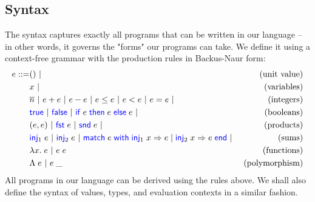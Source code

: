 \documentclass[a4paper, 11pt]{report}
\theoremstyle{definition}
\newcommand{\BNFdef}{::=}
\newcommand{\ALT}{~|~}
\newcommand{\Keyword}[1]{{\color{blue} \mathsf{#1}}}
\newcommand{\var}{x}
\newcommand{\expr}{e}
\newcommand{\TT}{()}
\newcommand{\Num}[1]{\overline{#1}}
\newcommand{\True}{\Keyword{true}}
\newcommand{\False}{\Keyword{false}}
\newcommand{\IfCmd}{\Keyword{if}}
\newcommand{\ThenCmd}{\Keyword{then}}
\newcommand{\ElseCmd}{\Keyword{else}}
\def\If#1then#2else#3{\IfCmd{}\;#1\;\ThenCmd{}\;#2\;\ElseCmd{}\;#3}
\newcommand{\Fst}{\Keyword{fst}\;}
\newcommand{\Snd}{\Keyword{snd}\;}
\newcommand{\Inj}[1]{\Keyword{inj}_{#1}\;}
\newcommand{\MatchCmd}{\Keyword{match}}
\newcommand{\WithCmd}{\Keyword{with}}
\newcommand{\EndCmd}{\Keyword{end}}
\def\Match#1with#2=>#3|#4=>#5end{\MatchCmd{}\;#1\;\WithCmd{}\;#2\Rightarrow#3 \;|\;#4\Rightarrow#5\;\EndCmd{}}
\newcommand{\Tlam}{\Lambda\;}
\newcommand{\Tapp}[1]{#1\;\_}
\begin{document}
\subsection{Syntax}
The syntax captures exactly all programs that can be written in our language – in other words, it governs the "forms" our programs can take. We define it using a context-free grammar with the production rules in Backus-Naur form:
\begin{align*}
  \expr \BNFdef & \TT \ALT & \text{(unit value)}\\
                & \var \ALT & \text{(variables)}\\
                & \Num{n} \ALT \expr + \expr \ALT \expr - \expr \ALT
                  \expr \le \expr \ALT \expr < \expr \ALT 
                  \expr = \expr \ALT & \text{(integers)}\\
                & \True \ALT \False \ALT {\If \expr then \expr else \expr} \ALT
                  & \text{(booleans)}\\
                & (\expr, \expr) \ALT \Fst \expr \ALT \Snd \expr \ALT
                  & \text{(products)}\\
                & \Inj{1} \expr \ALT \Inj{2} \expr \ALT 
                  \Match \expr with \Inj{1} \var => \expr | \Inj{2} \var => \expr end \ALT
                  & \text{(sums)}\\
                & \fun \var . \expr \ALT \expr \; \expr
                  & \text{(functions)}\\
                & \Tlam \expr \ALT \Tapp{\expr} & \text{(polymorphism)}
\end{align*}
All programs in our language can be derived using the rules above. We shall also define the syntax of values, types, and evaluation contexts in a similar fashion.
\end{document}
